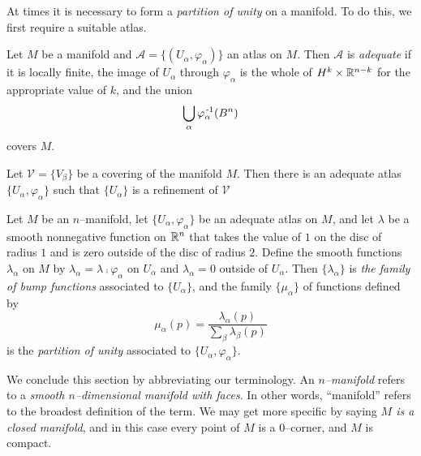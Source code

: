 At times it is necessary to form a \emph{partition of unity} on a manifold.
To do this, we first require a suitable atlas.

\begin{defn}
	\label{def:adequate}
	Let $M$ be a manifold and $\mathcal{A}=\{(U_\alpha,\varphi_\alpha)\}$ an atlas on $M$.
	Then $\mathcal{A}$ is \emph{adequate} if it is locally finite, the image of $U_\alpha$ through $\varphi_\alpha$ is the whole of $H^k\times\mathbb{R}^{n-k}$ for the appropriate value of $k$, and the union 
	\[
		\bigcup_\alpha \varphi_\alpha^{\,\text{-}1}(B^n)
	\]
	covers $M$.
\end{defn}

\begin{theorem}
	Let $\mathcal{V}=\{V_\beta\}$ be a covering of the manifold $M$.
	Then there is an adequate atlas $\{U_\alpha,\varphi_\alpha\}$ such that $\{U_\alpha\}$ is a refinement of $\mathcal{V}$
\end{theorem}

\begin{defn}
	Let $M$ be an $n$--manifold, let $\{U_\alpha,\varphi_\alpha\}$ be an adequate atlas on $M$, and let $\lambda$ be a smooth nonnegative function on $\mathbb{R}^n$ that takes the value of $1$ on the disc of radius $1$ and is zero outside of the disc of radius $2$.
	Define the smooth functions $\lambda_\alpha$ on $M$ by $\lambda_\alpha=\lambda\comp\varphi_\alpha$ on $U_\alpha$ and $\lambda_\alpha=0$ outside of $U_\alpha$.
	Then $\{\lambda_\alpha\}$ is \emph{the family of bump functions} associated to $\{U_\alpha\}$, and the family $\{\mu_\alpha\}$ of functions defined by
	\[
		\mu_\alpha(p)=\frac{\lambda_\alpha(p)}{\sum_\beta\lambda_\beta(p)}
	\]
	is the \emph{partition of unity} associated to $\{U_\alpha,\varphi_\alpha\}$.
\end{defn}

We conclude this section by abbreviating our terminology.
An \emph{$n$--manifold} refers to a \emph{smooth $n$--dimensional manifold with faces}.
In other words, ``manifold'' refers to the broadest definition of the term.
We may get more specific by saying \emph{$M$ is a closed manifold}, and in this case every point of $M$ is a 0--corner, and $M$ is compact.


